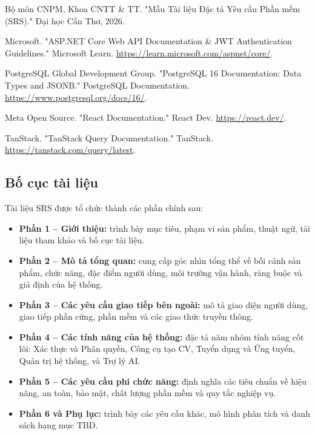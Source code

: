 \begin{enumerate}[label={[\arabic*]}, leftmargin=1.8em]
    \item Bộ môn CNPM, Khoa CNTT \& TT. "Mẫu Tài liệu Đặc tả Yêu cầu Phần mềm (SRS)." Đại học Cần Thơ, 2026.

    \item Microsoft. "ASP.NET Core Web API Documentation \& JWT Authentication Guidelines." Microsoft Learn. \url{https://learn.microsoft.com/aspnet/core/}.

    \item PostgreSQL Global Development Group. "PostgreSQL 16 Documentation: Data Types and JSONB." PostgreSQL Documentation. \url{https://www.postgresql.org/docs/16/}.

    \item Meta Open Source. "React Documentation." React Dev. \url{https://react.dev/}.

    \item TanStack. "TanStack Query Documentation." TanStack. \url{https://tanstack.com/query/latest}.
\end{enumerate}

\subsection{Bố cục tài liệu}

\noindent Tài liệu SRS được tổ chức thành các phần chính sau:

\begin{itemize}
    \item \textbf{Phần 1 -- Giới thiệu:} trình bày mục tiêu, phạm vi sản phẩm, thuật ngữ, tài liệu tham khảo và bố cục tài liệu.
    \item \textbf{Phần 2 -- Mô tả tổng quan:} cung cấp góc nhìn tổng thể về bối cảnh sản phẩm, chức năng, đặc điểm người dùng, môi trường vận hành, ràng buộc và giả định của hệ thống.
    \item \textbf{Phần 3 -- Các yêu cầu giao tiếp bên ngoài:} mô tả giao diện người dùng, giao tiếp phần cứng, phần mềm và các giao thức truyền thông.
    \item \textbf{Phần 4 -- Các tính năng của hệ thống:} đặc tả năm nhóm tính năng cốt lõi: Xác thực và Phân quyền, Công cụ tạo CV, Tuyển dụng và Ứng tuyển, Quản trị hệ thống, và Trợ lý AI.
    \item \textbf{Phần 5 -- Các yêu cầu phi chức năng:} định nghĩa các tiêu chuẩn về hiệu năng, an toàn, bảo mật, chất lượng phần mềm và quy tắc nghiệp vụ.
    \item \textbf{Phần 6 và Phụ lục:} trình bày các yêu cầu khác, mô hình phân tích và danh sách hạng mục TBD.
\end{itemize}

